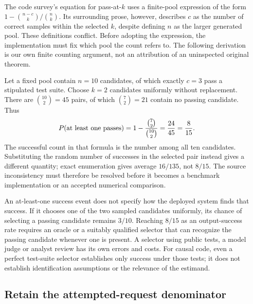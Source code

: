 The code survey's equation for pass-at-$k$ uses a finite-pool expression of the
form $1-\binom{n-c}{k}/\binom{n}{k}$. Its surrounding prose, however, describes
$c$ as the number of correct samples within the selected $k$, despite defining
$n$ as the larger generated pool. These definitions conflict. Before adopting
the expression, the implementation must fix which pool the count refers to.
The following derivation is our own finite counting argument, not an attribution
of an uninspected original theorem.~\citep{exec19_surveys_code}

Let a fixed pool contain $n=10$ candidates, of which exactly $c=3$ pass a
stipulated test suite. Choose $k=2$ candidates uniformly without replacement.
There are $\binom{10}{2}=45$ pairs, of which $\binom72=21$ contain no passing
candidate. Thus
\begin{equation}
 P(\hbox{at least one passes})
 =1-\frac{\binom72}{\binom{10}2}=\frac{24}{45}=\frac8{15}.
 \label{exec19:evalcode-pool}
\end{equation}
The successful count in that formula is the number among all ten candidates.
Substituting the random number of successes in the selected pair instead gives
a different quantity; exact enumeration gives average $16/135$, not $8/15$.
The source inconsistency must therefore be resolved before it becomes a
benchmark implementation or an accepted numerical comparison.
\citep{exec19_surveys_reference}

An at-least-one success event does not specify how the deployed system finds
that success. If it chooses one of the two sampled candidates uniformly,
its chance of selecting a passing candidate remains $3/10$. Reaching $8/15$
as an output-success rate requires an oracle or a suitably qualified selector
that can recognize the passing candidate whenever one is present. A selector
using public tests, a model judge or analyst review has its own errors and
costs. For causal code, even a perfect test-suite selector establishes only
success under those tests; it does not establish identification assumptions or
the relevance of the estimand.~\citep{exec19_surveys_reference}

\subsection{Retain the attempted-request denominator}
\label{exec19:evalcode-pipeline}

